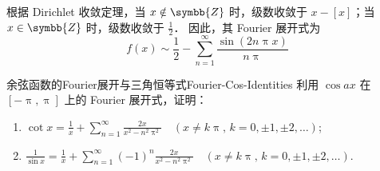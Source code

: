 \begin{solution}
    根据 Dirichlet 收敛定理，当 $x \notin \symbb{Z}$ 时，级数收敛于 $x - [x]$；当 $x \in \symbb{Z}$ 时，级数收敛于 $\frac{1}{2}$．
    因此，其 Fourier 展开式为
    \begin{equation}
        \boxed{f(x) \sim \frac{1}{2} - \sum_{n=1}^{\infty} \frac{\sin(2n\uppi x)}{n\uppi}}
    \end{equation}
\end{solution}

\begin{problem}{余弦函数的Fourier展开与三角恒等式}{Fourier-Cos-Identities}
    利用 $\cos ax$ 在 $[-\uppi, \uppi]$ 上的 Fourier 展开式，证明：
    \begin{enumerate}
        \item $\cot x = \frac{1}{x} + \sum_{n=1}^{\infty} \frac{2x}{x^2 - n^2 \uppi^2} \quad (x \neq k\uppi, \, k = 0, \pm 1, \pm 2, \dots)$;
        \item $\frac{1}{\sin x} = \frac{1}{x} + \sum_{n=1}^{\infty} (-1)^n \frac{2x}{x^2 - n^2 \uppi^2} \quad (x \neq k\uppi, \, k = 0, \pm 1, \pm 2, \dots)$.
    \end{enumerate}
\end{problem}

